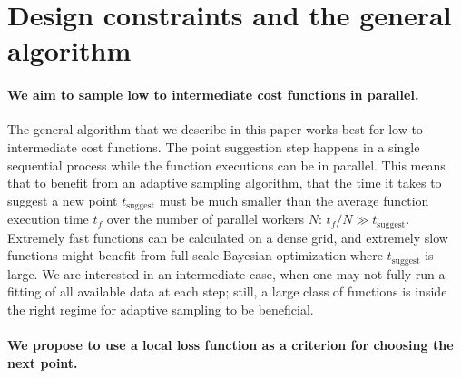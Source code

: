 \documentclass[english, twocolumn, 10pt, aps, superscriptaddress, floatfix, prb, citeautoscript]{revtex4-1}
\begin{document}
\hypertarget{design-constraints-and-the-general-algorithm}{%
\section{Design constraints and the general algorithm}\label{design-constraints-and-the-general-algorithm}}

\hypertarget{we-aim-to-sample-low-to-intermediate-cost-functions-in-parallel.}{%
\paragraph{We aim to sample low to intermediate cost functions in parallel.}\label{we-aim-to-sample-low-to-intermediate-cost-functions-in-parallel.}}

The general algorithm that we describe in this paper works best for low to intermediate cost functions.
The point suggestion step happens in a single sequential process while the function executions can be in parallel.
This means that to benefit from an adaptive sampling algorithm, that the time it takes to suggest a new point \(t_\textrm{suggest}\) must be much smaller than the average function execution time \(t_f\) over the number of parallel workers \(N\): \(t_f / N \gg t_\textrm{suggest}\).
Extremely fast functions can be calculated on a dense grid, and extremely slow functions might benefit from full-scale Bayesian optimization where \(t_\textrm{suggest}\) is large.
We are interested in an intermediate case, when one may not fully run a fitting of all available data at each step; still, a large class of functions is inside the right regime for adaptive sampling to be beneficial.

\hypertarget{we-propose-to-use-a-local-loss-function-as-a-criterion-for-choosing-the-next-point.}{%
\paragraph{We propose to use a local loss function as a criterion for choosing the next point.}\label{we-propose-to-use-a-local-loss-function-as-a-criterion-for-choosing-the-next-point.}}
\end{document}
